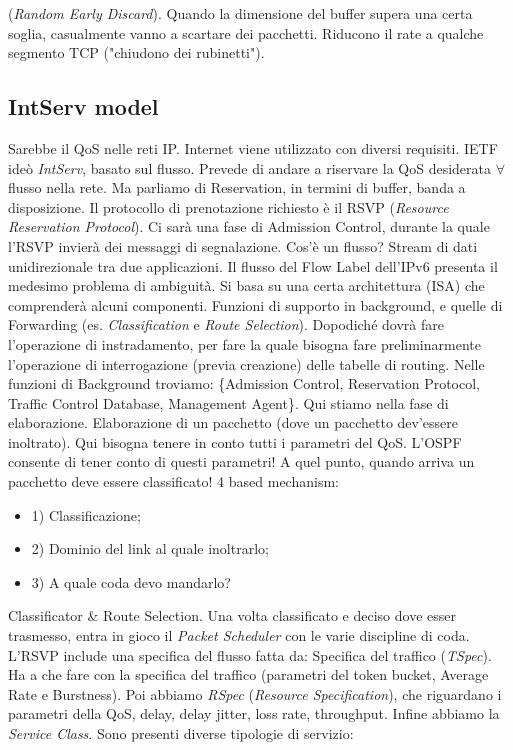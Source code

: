(\textit{Random Early Discard}). Quando la dimensione del buffer supera una certa soglia, casualmente vanno a scartare dei pacchetti. Riducono il rate a qualche segmento TCP ("chiudono dei rubinetti"). 

\subsection{IntServ model}

Sarebbe il QoS nelle reti IP. Internet viene utilizzato con diversi requisiti. IETF ideò \textit{IntServ}, basato sul flusso. Prevede di andare a riservare la QoS desiderata $\forall$ flusso nella rete. Ma parliamo di Reservation, in termini di buffer, banda a disposizione. Il protocollo di prenotazione richiesto è il RSVP (\textit{Resource Reservation Protocol}). Ci sarà una fase di Admission Control, durante la quale l'RSVP invierà dei messaggi di segnalazione. Cos'è un flusso? Stream di dati unidirezionale tra due applicazioni. Il flusso del Flow Label dell'IPv6 presenta il medesimo problema di ambiguità. Si basa su una certa architettura (ISA) che comprenderà alcuni componenti. Funzioni di supporto in background, e quelle di Forwarding (es. \textit{Classification} e \textit{Route Selection}). Dopodiché dovrà fare l'operazione di instradamento, per fare la quale bisogna fare preliminarmente l'operazione di interrogazione (previa creazione) delle tabelle di routing. Nelle funzioni di Background troviamo: \{Admission Control, Reservation Protocol, Traffic Control Database, Management Agent\}. Qui stiamo nella fase di elaborazione. Elaborazione di un pacchetto (dove un pacchetto dev'essere inoltrato). Qui bisogna tenere in conto tutti i parametri del QoS. L'OSPF consente di tener conto di questi parametri! A quel punto, quando arriva un pacchetto deve essere classificato! 4 based mechanism:

\begin{itemize}
\item{1)} Classificazione;
\item{2)} Dominio del link al quale inoltrarlo;
\item{3)} A quale coda devo mandarlo?
\end{itemize}

Classificator \& Route Selection. Una volta classificato e deciso dove esser trasmesso, entra in gioco il \textit{Packet Scheduler} con le varie discipline di coda. L'RSVP include una specifica del flusso fatta da: Specifica del traffico (\textit{TSpec}). Ha a che fare con la specifica del traffico (parametri del token bucket, Average Rate e Burstness). Poi abbiamo \textit{RSpec} (\textit{Resource Specification}), che riguardano i parametri della QoS, delay, delay jitter, loss rate, throughput. Infine abbiamo la \textit{Service Class}. Sono presenti diverse tipologie di servizio:

